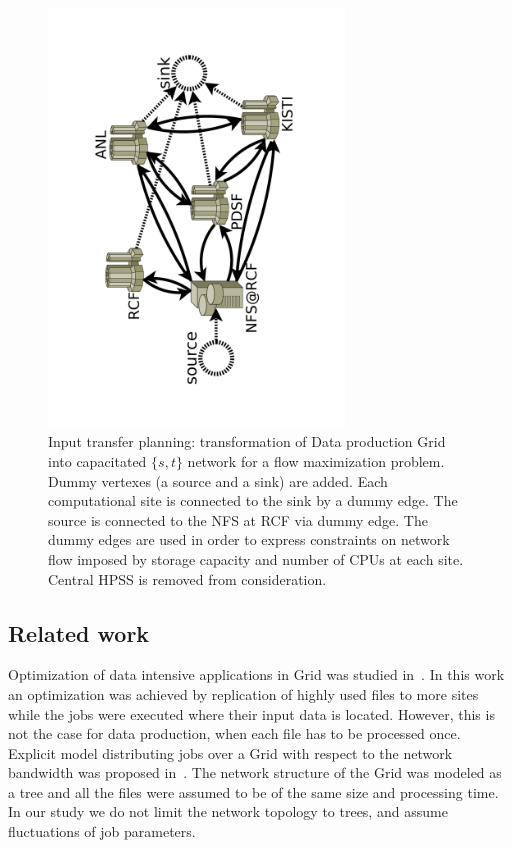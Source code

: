 \documentclass[english]{ddny}
\begin{document}
\begin{figure}[h]
	\begin{center}
		\includegraphics [trim= 30mm 30mm 30mm 30mm , clip, angle =-90, width=0.7\textwidth]{pic/real_network.pdf}
	\end{center}
	\caption{Input transfer planning: transformation of Data production Grid into   capacitated $\{s,t\}$ network for a flow maximization problem. Dummy vertexes (a source and a sink) are added. Each computational site is connected to the sink by a dummy edge. The source is connected to the NFS at RCF via dummy edge. The dummy edges are used in order to express constraints on network flow imposed by storage capacity and number of CPUs at each site.  Central HPSS is removed from consideration.}
	\label{real_network}
\end{figure} 

\subsection{Related work}
Optimization of data intensive applications in Grid was studied
in~\cite{Globus_scheduler}. In this work an optimization was achieved by
replication of highly used files to more sites while the jobs were executed
where their input data is located. However, this is not the case for data
production, when each file has to be processed once. 
%
Explicit model distributing jobs over a Grid with respect to the network
bandwidth was proposed in~\cite{Trees}. The network structure of the Grid was
modeled as a tree and all the files were assumed to be of the same size and
processing time. In our study we do not limit the network topology to trees,
and assume fluctuations of job parameters. 
\end{document}
